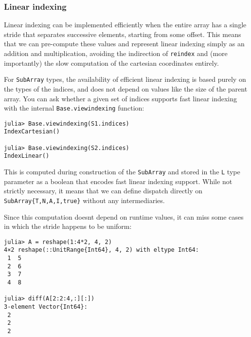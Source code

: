 \hypertarget{18413909182716267462}{}


\subsubsection{Linear indexing}



Linear indexing can be implemented efficiently when the entire array has a single stride that separates successive elements, starting from some offset. This means that we can pre-compute these values and represent linear indexing simply as an addition and multiplication, avoiding the indirection of \texttt{reindex} and (more importantly) the slow computation of the cartesian coordinates entirely.



For \texttt{SubArray} types, the availability of efficient linear indexing is based purely on the types of the indices, and does not depend on values like the size of the parent array. You can ask whether a given set of indices supports fast linear indexing with the internal \texttt{Base.viewindexing} function:




\begin{verbatim}
julia> Base.viewindexing(S1.indices)
IndexCartesian()

julia> Base.viewindexing(S2.indices)
IndexLinear()
\end{verbatim}



This is computed during construction of the \texttt{SubArray} and stored in the \texttt{L} type parameter as a boolean that encodes fast linear indexing support. While not strictly necessary, it means that we can define dispatch directly on \texttt{SubArray\{T,N,A,I,true\}} without any intermediaries.



Since this computation doesn{\textquotesingle}t depend on runtime values, it can miss some cases in which the stride happens to be uniform:




\begin{verbatim}
julia> A = reshape(1:4*2, 4, 2)
4×2 reshape(::UnitRange{Int64}, 4, 2) with eltype Int64:
 1  5
 2  6
 3  7
 4  8

julia> diff(A[2:2:4,:][:])
3-element Vector{Int64}:
 2
 2
 2
\end{verbatim}



